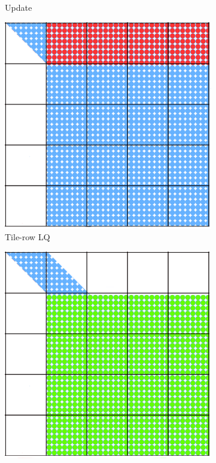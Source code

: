 \begin{figure}[h!]
\begin{subfigure}[t]{0.2 \textwidth}
    \caption{\label{fig:qr_update_1}Update}
  \end{subfigure}
  \hfill
    \begin{subfigure}[t]{0.2 \textwidth}
    \includegraphics[width=\textwidth]{fig/SVD_panel_3_grid}
    \caption{\label{fig:lq_1}\small{Tile-row LQ}}
    \end{subfigure}
    \hfill
    \begin{subfigure}[t]{0.2 \textwidth}
      \includegraphics[width=\textwidth]{fig/SVD_panel_4_grid}

\end{subfigure}
\end{figure}
